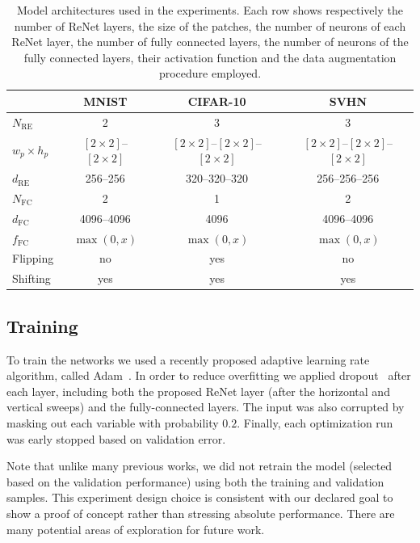 \begin{table}[t]
    \centering
    \begin{tabular}{l || c | c | c }
        & MNIST & CIFAR-10 & SVHN \\
        \hline
        \hline
    $N_{\text{RE}}$ & 2 & 3 & 3 \\
        \hline
        $w_p \times h_p$ & $[2\times 2]$--$[2 \times 2]$ & $[2\times 2]$--$[2 \times 2]$--$[2
        \times 2]$ & $[2\times 2]$--$[2 \times 2]$--$[2 \times 2]$ \\
        \hline
    $d_{\text{RE}}$ & 256--256 & 320--320--320 & 256--256--256 \\
        \hline
    $N_{\text{FC}}$ & 2 & 1 & 2 \\
        \hline
    $d_{\text{FC}}$ & 4096--4096 & 4096 & 4096--4096 \\
        \hline
    $f_{\text{FC}}$ & $\max(0, x)$ & $\max(0,x)$ & $\max(0,x)$ \\
        \hline
    Flipping & no & yes & no \\
        \hline
    Shifting & yes & yes & yes \\
    \end{tabular}
    \caption{Model architectures used in the experiments. Each row shows
             respectively the number of ReNet layers, the size of the patches,
             the number of neurons of each ReNet layer, the number of fully
             connected layers, the number of neurons of the fully connected
             layers, their activation function and the data augmentation
             procedure employed.}
    \label{tbl:architectures}
\end{table}

\subsection{Training}

To train the networks we used a recently proposed adaptive learning rate
algorithm, called Adam~\citep{Kingma2014}. In order to reduce overfitting we
applied dropout~\citep{Srivastava14} after each layer, including both the
proposed ReNet layer (after the horizontal and vertical sweeps) and the
fully-connected layers. The input was also corrupted by masking out each variable
with probability $0.2$. Finally, each optimization run was early stopped based
on validation error.

Note that unlike many previous works, we did not retrain the model (selected
based on the validation performance) using both the training and validation
samples. This experiment design choice is consistent with our declared goal to
show a proof of concept rather than stressing absolute performance. There are
many potential areas of exploration for future work.

